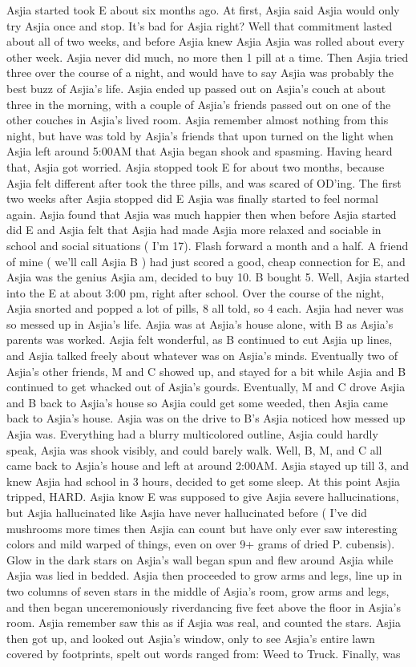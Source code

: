 \documentclass[12pt]{book}
\begin{document}
Asjia started took E about six months ago. At first, Asjia said Asjia would only try Asjia once and stop. It's bad for Asjia right? Well that commitment lasted about all of two weeks, and before Asjia knew Asjia Asjia was rolled about every other week. Asjia never did much, no more then 1 pill at a time. Then Asjia tried three over the course of a night, and would have to say Asjia was probably the best buzz of Asjia's life. Asjia ended up passed out on Asjia's couch at about three in the morning, with a couple of Asjia's friends passed out on one of the other couches in Asjia's lived room. Asjia remember almost nothing from this night, but have was told by Asjia's friends that upon turned on the light when Asjia left around 5:00AM that Asjia began shook and spasming. Having heard that, Asjia got worried. Asjia stopped took E for about two months, because Asjia felt different after took the three pills, and was scared of OD'ing. The first two weeks after Asjia stopped did E Asjia was finally started to feel normal again. Asjia found that Asjia was much happier then when before Asjia started did E and Asjia felt that Asjia had made Asjia more relaxed and sociable in school and social situations ( I'm 17). Flash forward a month and a half. A friend of mine ( we'll call Asjia B ) had just scored a good, cheap connection for E, and Asjia was the genius Asjia am, decided to buy 10. B bought 5. Well, Asjia started into the E at about 3:00 pm, right after school. Over the course of the night, Asjia snorted and popped a lot of pills, 8 all told, so 4 each. Asjia had never was so messed up in Asjia's life. Asjia was at Asjia's house alone, with B as Asjia's parents was worked. Asjia felt wonderful, as B continued to cut Asjia up lines, and Asjia talked freely about whatever was on Asjia's minds. Eventually two of Asjia's other friends, M and C showed up, and stayed for a bit while Asjia and B continued to get whacked out of Asjia's gourds. Eventually, M and C drove Asjia and B back to Asjia's house so Asjia could get some weeded, then Asjia came back to Asjia's house. Asjia was on the drive to B's Asjia noticed how messed up Asjia was. Everything had a blurry multicolored outline, Asjia could hardly speak, Asjia was shook visibly, and could barely walk. Well, B, M, and C all came back to Asjia's house and left at around 2:00AM. Asjia stayed up till 3, and knew Asjia had school in 3 hours, decided to get some sleep. At this point Asjia tripped, HARD. Asjia know E was supposed to give Asjia severe hallucinations, but Asjia hallucinated like Asjia have never hallucinated before ( I've did mushrooms more times then Asjia can count but have only ever saw interesting colors and mild warped of things, even on over 9+ grams of dried P. cubensis). Glow in the dark stars on Asjia's wall began spun and flew around Asjia while Asjia was lied in bedded. Asjia then proceeded to grow arms and legs, line up in two columns of seven stars in the middle of Asjia's room, grow arms and legs, and then began unceremoniously riverdancing five feet above the floor in Asjia's room. Asjia remember saw this as if Asjia was real, and counted the stars. Asjia then got up, and looked out Asjia's window, only to see Asjia's entire lawn covered by footprints, spelt out words ranged from: Weed to Truck. Finally, was 
\end{document}
